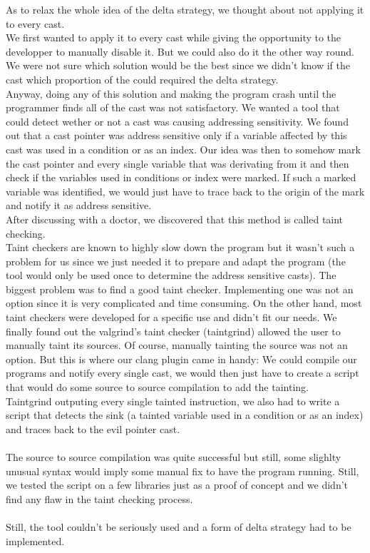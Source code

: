 \documentclass[english]{enstaPRE}
\begin{document}
As to relax the whole idea of the delta strategy, we thought about not applying it to every cast. \\
We first wanted to apply it to every cast while giving the opportunity to the developper to manually disable it. But we could also do
it the other way round. We were not sure which solution would be the best since we didn't know if the cast which proportion of the 
could required the delta strategy. \\ Anyway, doing any of this solution and making the program crash until the programmer finds all
of the cast was not satisfactory.
We wanted a tool that could detect wether or not a cast was causing addressing sensitivity. We found out that a cast pointer was
address sensitive only if a variable affected by this cast was used in a condition or as an index.
Our idea was then to somehow mark the cast pointer and every single variable that was derivating from it and then check if the variables
used in conditions or index were marked. If such a marked variable was identified, we would just have to trace back to the origin of
the mark and notify it as address sensitive. \\ 
After discussing with a doctor, we discovered that this method is called taint checking. \\
Taint checkers are known to highly slow down the program but it wasn't such a problem for us since we just needed it to prepare and 
adapt the program (the tool would only be used once to determine the address sensitive casts). The biggest problem was to find a good 
taint checker. Implementing one was not an option since it is very complicated and time consuming. On the other hand, most taint 
checkers were developed for a specific use and didn't fit our needs. We finally found out the valgrind's taint checker (taintgrind)
allowed the user to manually taint its sources. Of course, manually tainting the source was not an option. But this is where our
clang plugin came in handy: We could compile our programs and notify every single cast, we would then just have to create a script 
that would do some source to source compilation to add the tainting.
\\ 
Taintgrind outputing every single tainted instruction, we also had to write a script that detects the sink (a tainted variable used
in a condition or as an index) and traces back to the evil pointer cast. \\ \\
The source to source compilation was quite successful but still, some slighlty unusual syntax would imply some manual fix to have the
program running. Still, we tested the script on a few libraries just as a proof of concept and we didn't find any flaw in the taint
checking process. \\ \\
Still, the tool couldn't be seriously used and a form of delta strategy had to be implemented. \\
\end{document}
